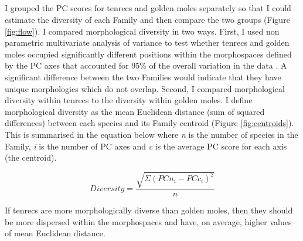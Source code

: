 \subsection{}
	
	I grouped the PC scores for tenrecs and golden moles separately so that I could estimate the diversity of each Family and then compare the two groups (Figure \ref{fig:flow}). I compared morphological diversity in two ways. First, I used non parametric multivariate analysis of variance \citep[npMANOVA;][]{Anderson2001} to test whether tenrecs and golden moles occupied significantly different positions within the morphospaces defined by the PC axes that accounted for 95\% of the overall variation in the data \citep[e.g.][]{Serb2011, Ruta2013}. A significant difference between the two Families would indicate that they have unique morphologies which do not overlap. Second, I compared morphological diversity within tenrecs to the diversity within golden moles. I define morphological diversity as the mean Euclidean distance (sum of squared differences) between each species and its Family centroid (Figure \ref{fig:centroids}). This is summarised in the equation below where \textit{n} is the number of species in the Family, \textit{i} is the number of PC axes and \textit{c} is the average PC score for each axis (the centroid). 
	
	\begin{equation}
	Diversity = \frac{\sqrt{\Sigma(PCn_{i}-PCc_{i})^2}}{n}
	\end{equation}

	
	
	If tenrecs are more morphologically diverse than golden moles, then they should be more dispersed within the morphospaces and have, on average, higher values of mean Euclidean distance. 
	

